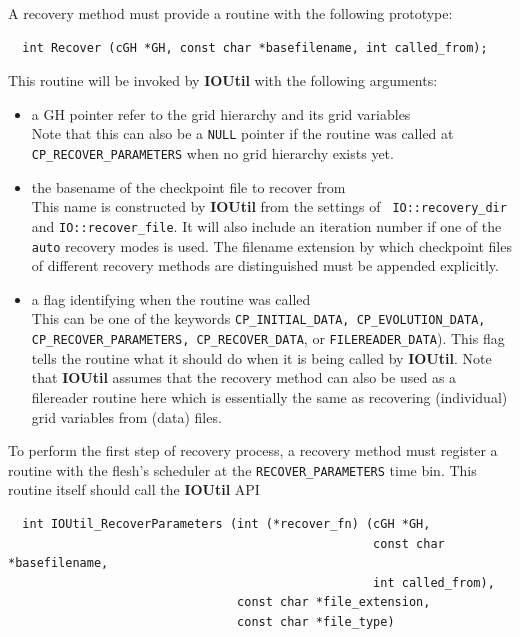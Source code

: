 \documentclass{article}
\begin{document}
A recovery method must provide a routine with the following prototype:

\begin{verbatim}
  int Recover (cGH *GH, const char *basefilename, int called_from);
\end{verbatim}

This routine will be invoked by {\bf IOUtil} with the following arguments:

\begin{itemize}
  \item a GH pointer refer to the grid hierarchy and its grid variables\\
    Note that this can also be a {\tt NULL} pointer if the routine was called
    at {\tt CP\_RECOVER\_PARAMETERS} when no grid hierarchy exists yet.

  \item the basename of the checkpoint file to recover from\\
    This name is constructed by {\bf IOUtil} from the settings of {\tt
    IO::recovery\_dir} and {\tt IO::recover\_file}. It will also include an
    iteration number if one of the {\tt auto} recovery modes is used.
    The filename extension by which checkpoint files of different recovery
    methods are distinguished must be appended explicitly.

  \item a flag identifying when the routine was called\\
    This can be one of the keywords {\tt CP\_INITIAL\_DATA, CP\_EVOLUTION\_DATA,
    CP\_RECOVER\_PARAMETERS, CP\_RECOVER\_DATA}, or {\tt FILEREADER\_DATA}).
    This flag tells the routine what it should do when it is being called by
    {\bf IOUtil}. Note that {\bf IOUtil} assumes that the recovery method can
    also be used as a filereader routine here which is essentially the same
    as recovering (individual) grid variables from (data) files.
\end{itemize}


To perform the first step of recovery process, a recovery method must register
a routine with the flesh's scheduler at the {\tt RECOVER\_PARAMETERS}
time bin. This routine itself should call the {\bf IOUtil} API

\begin{verbatim}
  int IOUtil_RecoverParameters (int (*recover_fn) (cGH *GH,
                                                   const char *basefilename,
                                                   int called_from),
                                const char *file_extension,
                                const char *file_type)
\end{verbatim}
\end{document}
